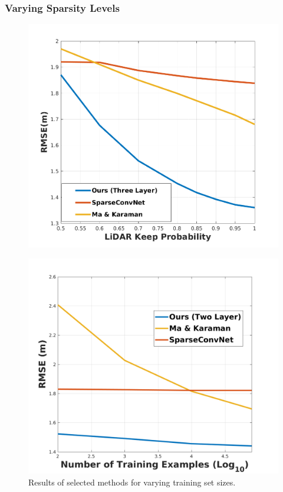 \subsubsection{Varying Sparsity Levels}
\label{sec:vary-spars-levels}
\begin{figure}
  \centering
  \begin{minipage}{0.45\textwidth}
    \centering
    \includegraphics[width=\linewidth]{sparsity_plot}
    \label{fig:sparsity}
  \end{minipage}\hspace{1cm}
  \begin{minipage}{0.45\textwidth}
    \centering
    \includegraphics[width=\linewidth]{trainsize_plot}
    \caption{Results of selected methods for varying training set sizes.}
    \label{fig:trainsize}
  \end{minipage}
\end{figure}

